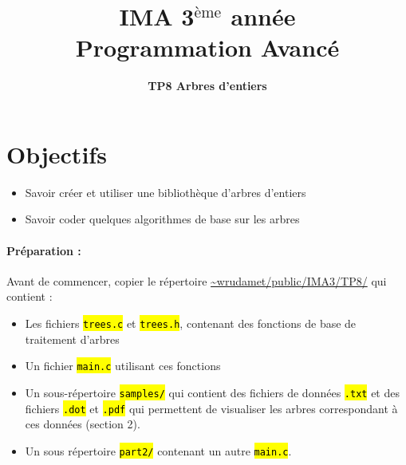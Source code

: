 \documentclass[final, pdftex, a4paper, openbib, ]{article}
\title{IMA 3$^{\mbox{\`eme}}$ année\\ Programmation Avancé
}
\author{\huge \textbf{TP8 Arbres d'entiers}}
\date{}
\let\OldTexttt\texttt
\renewcommand{\texttt}[1]{\OldTexttt{\hl{#1}}}
\begin{document}
\posttitle{\par\end{center}}
\setlength{\droptitle}{-45pt}
\maketitle

\vspace{-1.7cm}
\section{Objectifs}

\begin{itemize}
	\item Savoir créer et utiliser une bibliothèque d'arbres d'entiers
	\item Savoir coder quelques algorithmes de base sur les arbres
\end{itemize}


\paragraph{Préparation : } Avant de commencer, copier le répertoire \url{~wrudamet/public/IMA3/TP8/} qui contient :

\begin{itemize}
	\item Les fichiers \texttt{trees.c} et \texttt{trees.h}, contenant des fonctions de base de traitement d'arbres
	\item Un fichier \texttt{main.c} utilisant ces fonctions
	\item Un sous-répertoire \texttt{samples/} qui contient des fichiers de données \texttt{.txt} et des fichiers \texttt{.dot} et \texttt{.pdf} qui permettent de visualiser les arbres correspondant à ces données (section 2).
	\item Un sous répertoire \texttt{part2/} contenant un autre \texttt{main.c}.
\end{itemize}
\end{document}

